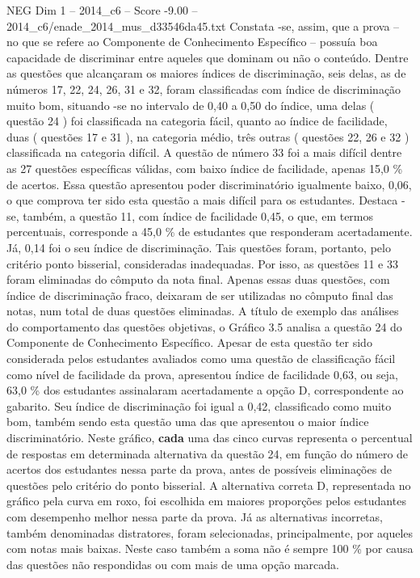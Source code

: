 \begin{textsample}{NEG Dim 1 – 2014\_c6 – Score -9.00 – 2014\_c6/enade\_2014\_mus\_d33546da45.txt}
Constata -se, assim, que a prova – no que se refere ao Componente de Conhecimento Específico – possuía boa capacidade de discriminar entre aqueles que dominam ou não o conteúdo.
Dentre as questões que alcançaram os maiores índices de discriminação, seis delas, as de números 17, 22, 24, 26, 31 e 32, foram classificadas com índice de discriminação muito bom, situando -se no intervalo de 0,40 a 0,50 do índice, uma delas ( questão 24 ) foi classificada na categoria fácil, quanto ao índice de facilidade, duas ( questões 17 e 31 ), na categoria médio, três outras ( questões 22, 26 e 32 ) classificada na categoria difícil.
A questão de número 33 foi a mais difícil dentre as 27 questões específicas válidas, com baixo índice de facilidade, apenas 15,0 \% de acertos.
Essa questão apresentou poder discriminatório igualmente baixo, 0,06, o que comprova ter sido esta questão a mais difícil para os estudantes.
Destaca -se, também, a questão 11, com índice de facilidade 0,45, o que, em termos percentuais, corresponde a 45,0 \% de estudantes que responderam acertadamente.
Já, 0,14 foi o seu índice de discriminação.
Tais questões foram, portanto, pelo critério ponto bisserial, consideradas inadequadas.
Por isso, as questões 11 e 33 foram eliminadas do cômputo da nota final.
Apenas essas duas questões, com índice de discriminação fraco, deixaram de ser utilizadas no cômputo final das notas, num total de duas questões eliminadas.
A título de exemplo das análises do comportamento das questões objetivas, o Gráfico 3.5 analisa a questão 24 do Componente de Conhecimento Específico.
Apesar de esta questão ter sido considerada pelos estudantes avaliados como uma questão de classificação fácil como nível de facilidade da prova, apresentou índice de facilidade 0,63, ou seja, 63,0 \% dos estudantes assinalaram acertadamente a opção D, correspondente ao gabarito.
Seu índice de discriminação foi igual a 0,42, classificado como muito bom, também sendo esta questão uma das que apresentou o maior índice discriminatório.
Neste gráfico, \textbf{cada} uma das cinco curvas representa o percentual de respostas em determinada alternativa da questão 24, em função do número de acertos dos estudantes nessa parte da prova, antes de possíveis eliminações de questões pelo critério do ponto bisserial.
A alternativa correta D, representada no gráfico pela curva em roxo, foi escolhida em maiores proporções pelos estudantes com desempenho melhor nessa parte da prova.
Já as alternativas incorretas, também denominadas distratores, foram selecionadas, principalmente, por aqueles com notas mais baixas.
Neste caso também a soma não é sempre 100 \% por causa das questões não respondidas ou com mais de uma opção marcada.

\end{textsample}

